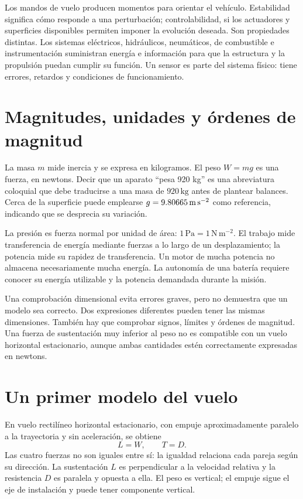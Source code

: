 Los mandos de vuelo producen momentos para orientar el vehículo. Estabilidad significa cómo responde a una perturbación; controlabilidad, si los actuadores y superficies disponibles permiten imponer la evolución deseada. Son propiedades distintas. Los sistemas eléctricos, hidráulicos, neumáticos, de combustible e instrumentación suministran energía e información para que la estructura y la propulsión puedan cumplir su función. Un sensor es parte del sistema físico: tiene errores, retardos y condiciones de funcionamiento.


\section{Magnitudes, unidades y órdenes de magnitud}
La masa $m$ mide inercia y se expresa en kilogramos. El peso $W=mg$ es una fuerza, en newtons. Decir que un aparato ``pesa 920 kg'' es una abreviatura coloquial que debe traducirse a una masa de $920\,\mathrm{kg}$ antes de plantear balances. Cerca de la superficie puede emplearse $g=9.80665\,\mathrm{m\,s^{-2}}$ como referencia, indicando que se desprecia su variación.

La presión es fuerza normal por unidad de área: $1\,\mathrm{Pa}=1\,\mathrm{N\,m^{-2}}$. El trabajo mide transferencia de energía mediante fuerzas a lo largo de un desplazamiento; la potencia mide su rapidez de transferencia. Un motor de mucha potencia no almacena necesariamente mucha energía. La autonomía de una batería requiere conocer su energía utilizable y la potencia demandada durante la misión.

Una comprobación dimensional evita errores graves, pero no demuestra que un modelo sea correcto. Dos expresiones diferentes pueden tener las mismas dimensiones. También hay que comprobar signos, límites y órdenes de magnitud. Una fuerza de sustentación muy inferior al peso no es compatible con un vuelo horizontal estacionario, aunque ambas cantidades estén correctamente expresadas en newtons.

\section{Un primer modelo del vuelo}
En vuelo rectilíneo horizontal estacionario, con empuje aproximadamente paralelo a la trayectoria y sin aceleración, se obtiene
\begin{equation}
 L=W,\qquad T=D.
\end{equation}
Las cuatro fuerzas no son iguales entre sí: la igualdad relaciona cada pareja según su dirección. La sustentación $L$ es perpendicular a la velocidad relativa y la resistencia $D$ es paralela y opuesta a ella. El peso es vertical; el empuje sigue el eje de instalación y puede tener componente vertical.

